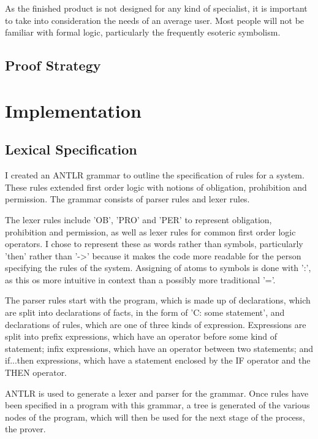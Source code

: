 \documentclass{l4proj}
\begin{document}
As the finished product is not designed for any kind of specialist, it is important to take into consideration the needs of an average user. Most people will not be familiar with formal logic, particularly the frequently esoteric symbolism. 


\section{Proof Strategy}


\chapter{Implementation}

\section{Lexical Specification}

I created an ANTLR grammar to outline the specification of rules for a system. These rules extended first order logic with notions of obligation, prohibition and permission. The grammar consists of parser rules and lexer rules. 

The lexer rules include 'OB', 'PRO' and 'PER' to represent obligation, prohibition and permission, as well as lexer rules for common first order logic operators. I chose to represent these as words rather than symbols, particularly 'then' rather than '->' because it makes the code more readable for the person specifying the rules of the system. Assigning of atoms to symbols is done with ':', as this os more intuitive in context than a possibly more traditional '='. 

The parser rules start with the program, which is made up of declarations, which are split into declarations of facts, in the form of 'C: some statement', and declarations of rules, which are one of three kinds of expression. Expressions are split into prefix expressions, which have an operator before some kind of statement; infix expressions, which have an operator between two statements; and if...then expressions, which have a statement enclosed by the IF operator and the THEN operator. 

ANTLR is used to generate a lexer and parser for the grammar. Once rules have been specified in a program with this grammar, a tree is generated of the various nodes of the program, which will then be used for the next stage of the process, the prover. 
\end{document}
